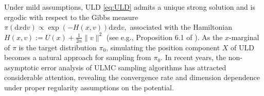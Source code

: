 \documentclass[12pt]{article}
\numberwithin{equation}{section}
\renewcommand{\P}{\mathbb{P}}
\begin{document}

Under mild assumptions, ULD \eqref{eq:ULD} admits a unique strong solution and is ergodic with respect to the Gibbs measure 
\(
\pi (\mathrm{d} x
\mathrm{d} v )
\propto 
\exp
 (-H(x,v))
 \mathrm{d} x
\mathrm{d} v,
\)
associated with the Hamiltonian
\(
H(x,v)
:= 
U(x)
+ 
\frac{1 }{2\alpha}\|v\|^2
\)
(see e.g., Proposition 6.1 of
\cite{pavliotis2014stochastic}).
As the $x$-marginal of \(\pi\) is the target distribution \(\pi_0\), 
simulating the position component $X$ of ULD becomes a natural approach for sampling from \(\pi_0\). 
%
In recent years, the non-asymptotic error analysis of ULMC sampling algorithms has attracted considerable attention, revealing the convergence rate and dimension dependence under proper regularity assumptions on the potential.
\end{document}
